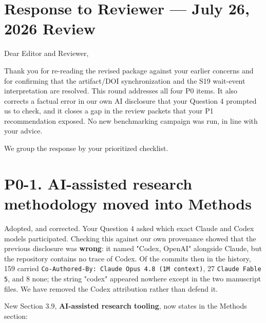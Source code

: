 \documentclass[11pt,a4paper]{article}
\begin{document}
\section*{Response to Reviewer --- July 26, 2026 Review}

Dear Editor and Reviewer,

Thank you for re-reading the revised package against your earlier concerns and for confirming that the artifact/DOI synchronization and the S19 wait-event interpretation are resolved. This round addresses all four P0 items. It also corrects a factual error in our own AI disclosure that your Question 4 prompted us to check, and it closes a gap in the review packets that your P1 recommendation exposed. No new benchmarking campaign was run, in line with your advice.

We group the response by your prioritized checklist.

\section*{P0-1. AI-assisted research methodology moved into Methods}

Adopted, and corrected. Your Question 4 asked which exact Claude and Codex models participated. Checking this against our own provenance showed that the previous disclosure was \textbf{wrong}: it named "Codex, OpenAI" alongside Claude, but the repository contains no trace of Codex. Of the commits then in the history, 159 carried \texttt{Co-Authored-By: Claude Opus 4.8 (1M context)}, 27 \texttt{Claude Fable 5}, and 8 none; the string "codex" appeared nowhere except in the two manuscript files. We have removed the Codex attribution rather than defend it.

New Section 3.9, \textbf{AI-assisted research tooling}, now states in the Methods section:
\end{document}
